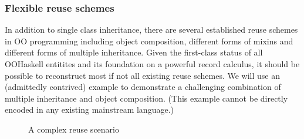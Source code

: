 \documentclass{jfp}
\begin{document}



\subsubsection{Flexible reuse schemes}

In addition to single class inheritance, there are several established
reuse schemes in OO programming including object composition,
different forms of mixins and different forms of multiple
inheritance. Given the first-class status of all OOHaskell entitites
and its foundation on a powerful record calculus, it should be
possible to reconstruct most if not all existing reuse schemes. We
will use an (admittedly contrived) example to demonstrate a
challenging combination of multiple inheritance and object
composition. (This example cannot be directly encoded in any existing
mainstream language.)


 



\begin{figure}[t]
\begin{center}
\end{center}
\caption{A complex reuse scenario}
\label{F:heavy}
\end{figure}
\end{document}
